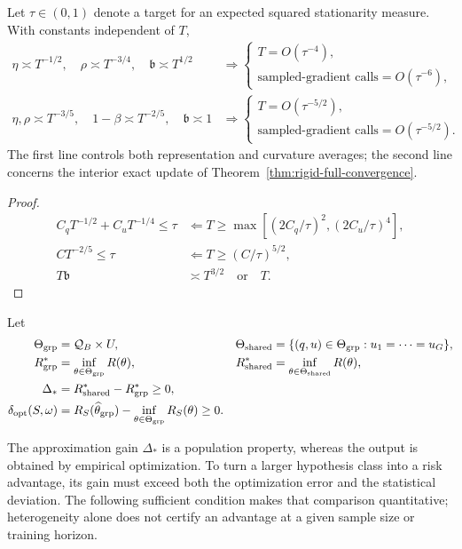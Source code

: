 \begin{corollary}
Let $\tau\in(0,1)$ denote a target for an expected squared stationarity measure.
With constants independent of $T$,
\begin{align}
 \eta\asymp T^{-1/2},\quad\rho\asymp T^{-3/4},\quad\mathfrak b\asymp T^{1/2}
 &\Longrightarrow
 \begin{cases}
 T=O(\tau^{-4}),\\
 \text{sampled-gradient calls}=O(\tau^{-6}),
 \end{cases}\\
 \eta,\rho\asymp T^{-3/5},\quad1-\beta\asymp T^{-2/5},\quad\mathfrak b\asymp1
 &\Longrightarrow
 \begin{cases}
 T=O(\tau^{-5/2}),\\
 \text{sampled-gradient calls}=O(\tau^{-5/2}).
 \end{cases}
\end{align}
The first line controls both representation and curvature averages; the second line concerns the interior exact update of Theorem~\ref{thm:rigid-full-convergence}.
\end{corollary}
\begin{proof}
\begin{align}
 C_qT^{-1/2}+C_uT^{-1/4}\le\tau
 &\Longleftarrow T\ge\max[(2C_q/\tau)^2,(2C_u/\tau)^4],\\
 CT^{-2/5}\le\tau&\Longleftarrow T\ge(C/\tau)^{5/2},\\
 T\mathfrak b&\asymp T^{3/2}\quad\text{or}\quad T.
\end{align}
\end{proof}

\begin{definition}
Let
\begin{align}
 \Theta_{\rm grp}&=\mathcal Q_B\times U,&
 \Theta_{\rm shared}&=\{(q,u)\in\Theta_{\rm grp}:u_1=\cdots=u_G\},\\
 R_{\rm grp}^*&=\inf_{\theta\in\Theta_{\rm grp}}R(\theta),&
 R_{\rm shared}^*&=\inf_{\theta\in\Theta_{\rm shared}}R(\theta),\\
 \Delta_*&=R_{\rm shared}^*-R_{\rm grp}^*\ge0,\\
 \delta_{\rm opt}(S,\omega)&=R_S(\widehat\theta_{\rm grp})-
 \inf_{\theta\in\Theta_{\rm grp}}R_S(\theta)\ge0.
\end{align}
\end{definition}

The approximation gain $\Delta_*$ is a population property, whereas the output is obtained by empirical optimization. To turn a larger hypothesis class into a risk advantage, its gain must exceed both the optimization error and the statistical deviation. The following sufficient condition makes that comparison quantitative; heterogeneity alone does not certify an advantage at a given sample size or training horizon.

